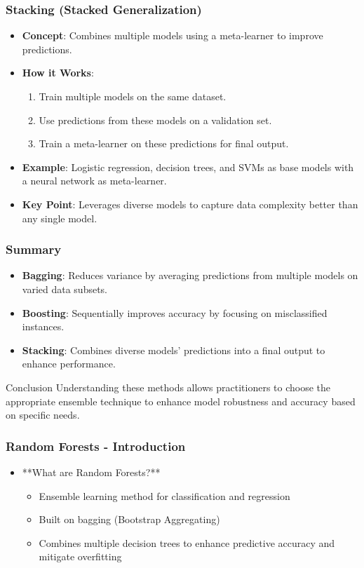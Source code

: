 \documentclass[aspectratio=169]{beamer}
\begin{document}
\begin{frame}[fragile]
    \frametitle{Stacking (Stacked Generalization)}
    \begin{itemize}
        \item \textbf{Concept}: Combines multiple models using a meta-learner to improve predictions.
        \item \textbf{How it Works}:
            \begin{enumerate}
                \item Train multiple models on the same dataset.
                \item Use predictions from these models on a validation set.
                \item Train a meta-learner on these predictions for final output.
            \end{enumerate}
        \item \textbf{Example}: Logistic regression, decision trees, and SVMs as base models with a neural network as meta-learner.
        \item \textbf{Key Point}: Leverages diverse models to capture data complexity better than any single model.
    \end{itemize}
\end{frame}

\begin{frame}[fragile]
    \frametitle{Summary}
    \begin{itemize}
        \item \textbf{Bagging}: Reduces variance by averaging predictions from multiple models on varied data subsets.
        \item \textbf{Boosting}: Sequentially improves accuracy by focusing on misclassified instances.
        \item \textbf{Stacking}: Combines diverse models' predictions into a final output to enhance performance.
    \end{itemize}
    \begin{block}{Conclusion}
        Understanding these methods allows practitioners to choose the appropriate ensemble technique to enhance model robustness and accuracy based on specific needs.
    \end{block}
\end{frame}

\begin{frame}[fragile]
    \frametitle{Random Forests - Introduction}
    \begin{itemize}
        \item **What are Random Forests?**
        \begin{itemize}
            \item Ensemble learning method for classification and regression
            \item Built on bagging (Bootstrap Aggregating)
            \item Combines multiple decision trees to enhance predictive accuracy and mitigate overfitting
        \end{itemize}
    \end{itemize}
\end{frame}
\end{document}
